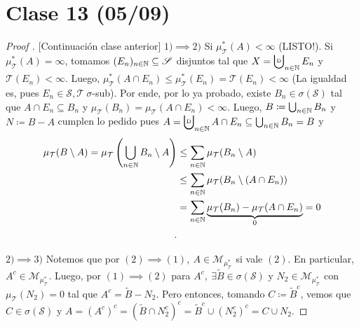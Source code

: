 \section{Clase 13 (05/09)}

\begin{proof}[Proof ][Continuación clase anterior]
	$1) \implies 2)$ Si $\mu_{\mathcal{T}}^{*}(A) < \infty$ (LISTO!). Si $\mu_{\mathcal{T}}^{*}(A) = \infty$, tomamos $(E_n)_{n\in\mathbb{N}} \subseteq \mathscr{S}$ disjuntos tal que $X = \bigcupd_{n\in\N} E_n$ y $\mathcal{T}(E_n) < \infty$. Luego, $\mu_{\mathcal{T}}^{*}(A \cap E_n) \leq \mu_{\mathcal{T}}^{*} (E_n) = \mathcal{T}(E_n) < \infty$ (La igualdad es, pues $E_n \in \mathscr{S}, \mathcal{T} \ \sigma$-sub). Por ende, por lo ya probado, existe $B_n \in \sigma(\mathscr{S})$ tal que $A \cap E_n \subseteq B_n$ y $\mu_{\mathcal{T}}(B_n) = \mu_{\mathcal{T}}(A \cap E_n) < \infty$. Luego, $B \coloneq \bigcup_{n\in\mathbb{N}} B_n$ y $N \coloneq B-A$ cumplen lo pedido pues $A = \bigcupd_{n\in\N} A \cap E_n \subseteq \bigcup_{n\in\N} B_n = B$ y
	\begin{align*}
		\mu_{\mathcal{T}}(B\setminus A) = \mu_{\mathcal{T}}\left( \bigcup_{n\in\mathbb{N}} B_n \setminus A \right) & \leq \sum_{n\in\mathbb{N}} \mu_{\mathcal{T}}(B_n \setminus A) \\
		& \leq \sum_{n\in\mathbb{N}} \mu_{\mathcal{T}}(B_n \setminus (A \cap E_n)) \\
		&= \sum_{n\in\mathbb{N}} \underbrace{\mu_{\mathcal{T}}(B_n) - \mu_{\mathcal{T}}(A \cap E_n)}_{0} = 0 \\
	.\end{align*}

	$2) \implies 3)$ Notemos que por $(2) \implies (1),\ A \in \mathscr{M}_{\mu_{\mathcal{T}}^{*}}$ si vale $(2)$. En particular, $A^c \in \mathscr{M}_{\mu_{\mathcal{T}}^{*}}$. Luego, por $(1) \implies (2)$ para $A^c,\ \exists \widetilde{B} \in \sigma(\mathscr{S})$ y $N_2 \in \mathscr{M}_{\mu_{\mathcal{T}}^{*}}$ con $\mu_{\mathcal{T}}(N_{2}) = 0$ tal que $A^c = \widetilde{B} - N_{2}$. Pero entonces, tomando $C \coloneq \widetilde{B}^c$, vemos que $C \in \sigma(\mathscr{S})$ y $A = (A^c)^c = (\widetilde{B} \cap N_{2}^c)^c = \widetilde{B}^c \cup (N_{2}^c)^c = C \cup N_2$.
\end{proof}

